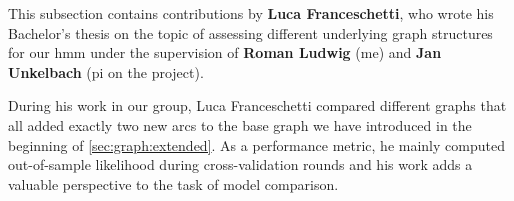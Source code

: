 \begin{tcolorbox}[
    title=\faIcon{users} Contributions,
    parbox=false,
    float
]
    This subsection contains contributions by  \textbf{Luca Franceschetti}, who wrote his Bachelor's thesis \cite{franceschetti_comparison_2022} on the topic of assessing different underlying graph structures for our \gls{hmm} under the supervision of  \textbf{Roman Ludwig} (me) and  \textbf{Jan Unkelbach} (\gls{pi} on the project).

    During his work in our group, Luca Franceschetti compared different graphs that all added exactly two new arcs to the base graph we have introduced in the beginning of \cref{sec:graph:extended}. As a performance metric, he mainly computed out-of-sample likelihood during cross-validation rounds and his work adds a valuable perspective to the task of model comparison.
\end{tcolorbox}
